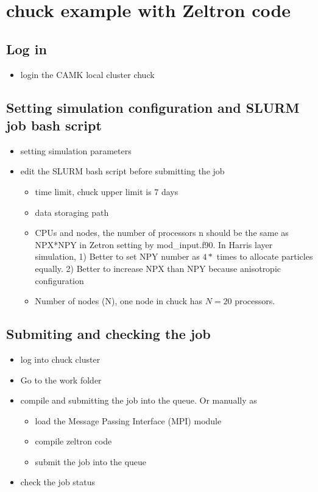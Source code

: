 \section{chuck example with Zeltron code}
\subsection{Log in}
\begin{itemize}
\item {} login the CAMK local cluster chuck
\end{itemize}

\subsection{Setting simulation configuration and SLURM job bash script}

\begin{itemize}
\item {} setting simulation parameters
\item {} edit the SLURM bash script before submitting the job
  \begin{itemize}
  \item time limit, chuck upper limit is 7 days
  \item data storaging path
  \item CPUs and nodes, the number of processors n should be the same as NPX*NPY in Zetron setting by mod\_input.f90. In Harris layer simulation, 1) Better to set NPY number as $4*$ times to allocate particles equally. 2) Better to increase NPX than NPY because anisotropic configuration
  \item Number of nodes (N), one node in chuck has $N = 20$ processors.
  \end{itemize}
\end{itemize}

\subsection{Submiting and checking the job}

\begin{itemize}
\item {} log into chuck cluster
\item {} Go to the work folder
\item {} compile and submitting the job into the queue. Or manually as
  \begin{itemize}
  \item {} load the Message Passing Interface (MPI) module
  \item {} compile zeltron code 
  \item {} submit the job into the queue
  \end{itemize}
\item {} check the job status
\end{itemize}

